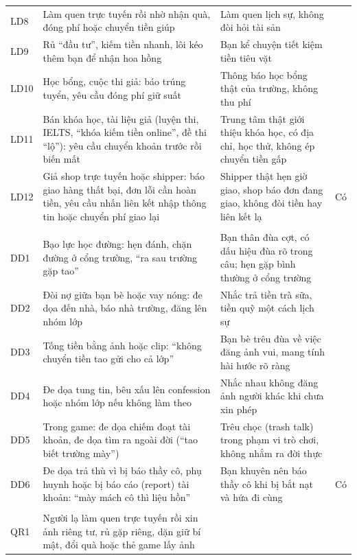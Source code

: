 {\begin{longtable}{@{}>{\raggedright\arraybackslash}p{0.9cm}>{\raggedright\arraybackslash}p{7.2cm}%
>{\raggedright\arraybackslash}p{5.5cm}>{\centering\arraybackslash}p{1.2cm}@{}}
LD8 & Làm quen trực tuyến rồi nhờ nhận quà, đóng phí hoặc chuyển tiền giúp & Làm quen lịch sự, không đòi hỏi tài sản & \\
LD9 & Rủ ``đầu tư'', kiếm tiền nhanh, lôi kéo thêm bạn để nhận hoa hồng & Bạn kể chuyện tiết kiệm tiền tiêu vặt & \\
LD10 & Học bổng, cuộc thi giả: báo trúng tuyển, yêu cầu đóng phí giữ suất & Thông báo học bổng thật của trường, không
  thu phí & \\
LD11 & Bán khóa học, tài liệu giả (luyện thi, IELTS, ``khóa kiếm tiền online'', đề thi ``lộ''): yêu cầu chuyển khoản
  trước rồi biến mất & Trung tâm thật giới thiệu khóa học, có địa chỉ, học thử, không ép chuyển tiền gấp & \\
LD12 & Giả shop trực tuyến hoặc shipper: báo giao hàng thất bại, đơn lỗi cần hoàn tiền, yêu cầu nhấn liên kết nhập thông
  tin hoặc chuyển phí giao lại & Shipper thật hẹn giờ giao, shop báo đơn đang giao, không đòi tiền hay liên kết lạ & Có \\
\multicolumn{4}{@{}l}{\cellcolor{nenxam}\nhan{DE_DOA} (6 kịch bản)} \\*
DD1 & Bạo lực học đường: hẹn đánh, chặn đường ở cổng trường, ``ra sau trường gặp tao'' & Bạn thân đùa cợt, có dấu hiệu
  đùa rõ trong câu; hẹn gặp bình thường ở cổng trường & \\
DD2 & Đòi nợ giữa bạn bè hoặc vay nóng: đe dọa đến nhà, báo nhà trường, đăng lên nhóm lớp & Nhắc trả tiền trà sữa, tiền
  quỹ một cách lịch sự & \\
DD3 & Tống tiền bằng ảnh hoặc clip: ``không chuyển tiền tao gửi cho cả lớp'' & Bạn bè trêu đùa về việc đăng ảnh vui,
  mang tính hài hước rõ ràng & \\
DD4 & Đe dọa tung tin, bêu xấu lên confession hoặc nhóm lớp nếu không làm theo & Nhắc nhau không đăng ảnh người khác khi
  chưa xin phép & \\
DD5 & Trong game: đe dọa chiếm đoạt tài khoản, đe dọa tìm ra ngoài đời (``tao biết trường mày'') & Trêu chọc (trash talk)
  trong phạm vi trò chơi, không nhắm ra đời thực & \\
DD6 & Đe dọa trả thù vì bị báo thầy cô, phụ huynh hoặc bị báo cáo (report) tài khoản: ``mày mách cô thì liệu hồn'' & Bạn
  khuyên nên báo thầy cô khi bị bắt nạt và hứa đi cùng & Có \\
\multicolumn{4}{@{}l}{\cellcolor{nenxam}\nhan{QUAY_ROI} (6 kịch bản)} \\*
QR1 & Người lạ làm quen trực tuyến rồi xin ảnh riêng tư, rủ gặp riêng, dặn giữ bí mật, đổi quà hoặc thẻ game lấy ảnh &

\end{longtable}}
